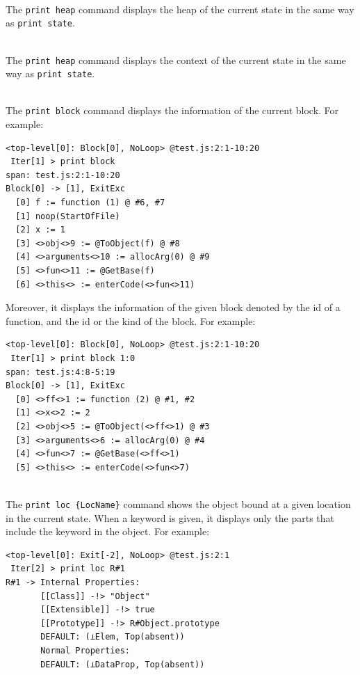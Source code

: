 \medskip\noindent
{}\\[.2em]
The \verb!print heap! command displays the heap of the current state
in the same way as \verb!print state!.

\medskip\noindent
{}\\[.2em]
The \verb!print heap! command displays the context of the current state
in the same way as \verb!print state!.

\medskip\noindent
{}\\[.2em]
The \verb!print block! command displays the information of
the current block. For example:
{\small
\begin{verbatim}
<top-level[0]: Block[0], NoLoop> @test.js:2:1-10:20
 Iter[1] > print block
span: test.js:2:1-10:20
Block[0] -> [1], ExitExc
  [0] f := function (1) @ #6, #7
  [1] noop(StartOfFile)
  [2] x := 1
  [3] <>obj<>9 := @ToObject(f) @ #8
  [4] <>arguments<>10 := allocArg(0) @ #9
  [5] <>fun<>11 := @GetBase(f)
  [6] <>this<> := enterCode(<>fun<>11)
\end{verbatim}
}

Moreover, it displays the information of the given block denoted
by the id of a function, and the id or the kind of the block.
For example:

{\small
\begin{verbatim}
<top-level[0]: Block[0], NoLoop> @test.js:2:1-10:20
 Iter[1] > print block 1:0
span: test.js:4:8-5:19
Block[0] -> [1], ExitExc
  [0] <>ff<>1 := function (2) @ #1, #2
  [1] <>x<>2 := 2
  [2] <>obj<>5 := @ToObject(<>ff<>1) @ #3
  [3] <>arguments<>6 := allocArg(0) @ #4
  [4] <>fun<>7 := @GetBase(<>ff<>1)
  [5] <>this<> := enterCode(<>fun<>7)
\end{verbatim}
}

\medskip\noindent
{}\\[.2em]
The \verb!print loc {LocName}! command shows the object
bound at a given location in the current state.
When a keyword is given, it displays only the parts that include the keyword
in the object.  For example:
{\small
\begin{verbatim}
<top-level[0]: Exit[-2], NoLoop> @test.js:2:1
 Iter[2] > print loc R#1
R#1 -> Internal Properties:
       [[Class]] -!> "Object"
       [[Extensible]] -!> true
       [[Prototype]] -!> R#Object.prototype
       DEFAULT: (⊥Elem, Top(absent))
       Normal Properties:
       DEFAULT: (⊥DataProp, Top(absent))
\end{verbatim}
}


